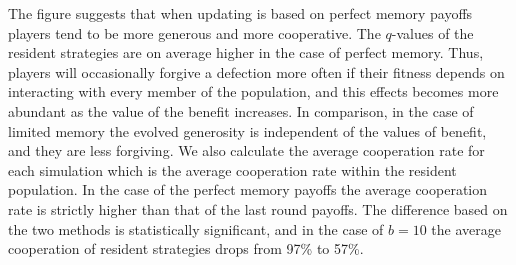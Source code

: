 \documentclass[11pt]{article}
\theoremstyle{plainCl1}
\theoremstyle{plainCl2}
\begin{document}
The figure suggests that when updating is based on perfect memory payoffs
players tend to be more generous and more cooperative. The $q$-values of the
resident strategies are on average higher in the case of perfect memory. Thus,
players will occasionally forgive a defection more often if their fitness
depends on interacting with every member of the population, and this effects
becomes more abundant as the value of the benefit increases. In comparison, in
the case of limited memory the evolved generosity is independent of the values
of benefit, and they are less forgiving. We also calculate the average
cooperation rate for each simulation which is the average cooperation rate
within the resident population. In the case of the perfect memory payoffs the
average cooperation rate is strictly higher than that of the last round payoffs.
The difference based on the two methods is statistically significant, and in the
case of $b=10$ the average cooperation of resident strategies drops from 97\% to
57\%.
\end{document}

